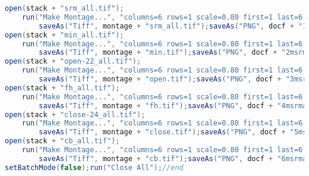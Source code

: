 \begin{lstlisting}[language=java, caption=Region merging on variable nest images.., label=cd:threshold-variable-srm]
open(stack + "srm_all.tif");
	run("Make Montage...", "columns=6 rows=1 scale=0.80 first=1 last=6 increment=1 border=4 font=30 label");
		saveAs("Tiff", montage + "srm_all.tif");saveAs("PNG", docf + "1msrmall.png");
open(stack + "min_all.tif");
	run("Make Montage...", "columns=6 rows=1 scale=0.80 first=1 last=6 increment=1 border=4 font=30 label");
		saveAs("Tiff", montage + "min.tif");saveAs("PNG", docf + "2msrmall.png");
open(stack + "open-22_all.tif");
	run("Make Montage...", "columns=6 rows=1 scale=0.80 first=1 last=6 increment=1 border=4 font=30 label");
		saveAs("Tiff", montage + "open.tif");saveAs("PNG", docf + "3msrmall.png");
open(stack + "fh_all.tif"); 
	run("Make Montage...", "columns=6 rows=1 scale=0.80 first=1 last=6 increment=1 border=4 font=30 label");
		saveAs("Tiff", montage + "fh.tif");saveAs("PNG", docf + "4msrmall.png");
open(stack + "close-24_all.tif"); 
	run("Make Montage...", "columns=6 rows=1 scale=0.80 first=1 last=6 increment=1 border=4 font=30 label");
		saveAs("Tiff", montage + "close.tif");saveAs("PNG", docf + "5msrmall.png");
open(stack + "cb_all.tif"); 
	run("Make Montage...", "columns=6 rows=1 scale=0.80 first=1 last=6 increment=1 border=4 font=30 label");
		saveAs("Tiff", montage + "cb.tif");saveAs("PNG", docf + "6msrmall.png");
setBatchMode(false);run("Close All");//end
\end{lstlisting}


